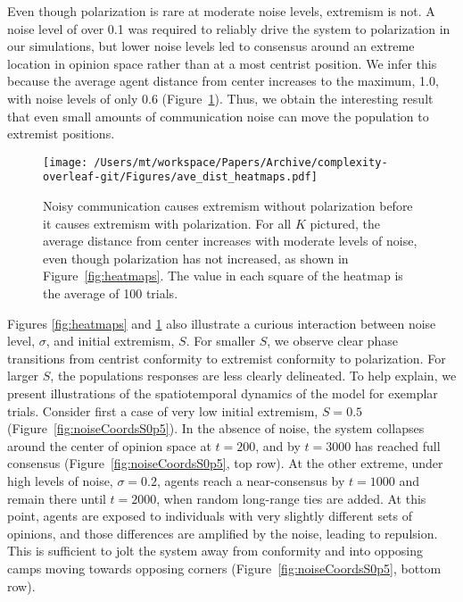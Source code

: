 Even though polarization is rare at moderate noise levels, extremism is not.
A noise level of over 0.1 was required to reliably drive
the system to polarization in our simulations, but lower noise levels led to consensus around an
extreme location in opinion space rather than at a most centrist position. We infer this because the average agent distance from center increases to the maximum, 1.0, with noise levels of only 0.6
(Figure~\ref{fig:avedistHeatmaps}). Thus, we obtain the interesting result that
even small amounts of communication noise can move the population to extremist
positions. 


\begin{figure}[H]
  \centering
  \texttt{[image: /Users/mt/workspace/Papers/Archive/complexity-overleaf-git/Figures/ave\_dist\_heatmaps.pdf]}
  \caption{Noisy communication causes extremism without polarization before
    it causes extremism with polarization.  For all $K$ pictured, the
    average distance from center increases with moderate levels of noise, even
    though polarization has not increased, as shown in Figure~\ref{fig:heatmaps}.
    The value in each square of the heatmap is the average of
    100 trials. 
  }
  \label{fig:avedistHeatmaps}
\end{figure}

Figures \ref{fig:heatmaps} and \ref{fig:avedistHeatmaps} also illustrate a curious interaction between noise level, $\sigma$, and initial extremism, $S$. For smaller $S$, we observe clear phase transitions from centrist conformity to extremist conformity to polarization. For larger $S$, the populations responses are less clearly delineated.
To help explain, we present illustrations of the spatiotemporal dynamics of the model for exemplar trials. 
Consider first a case of very low initial extremism, $S=0.5$  (Figure~\ref{fig:noiseCoordsS0p5}). 
In the absence of noise, the system collapses around the center of opinion space at $t=200$, and by 
$t=3000$ has reached full consensus (Figure~\ref{fig:noiseCoordsS0p5}, top row). At the other extreme, under high levels of noise, $\sigma=0.2$,
agents reach a near-consensus by $t=1000$ and remain there until $t=2000$, when random long-range ties are added. 
At this point, agents are exposed to individuals with very slightly different sets of opinions, and those differences are amplified by the noise, leading to repulsion. This is sufficient to jolt the system away from conformity and into opposing camps moving towards opposing corners 
(Figure~\ref{fig:noiseCoordsS0p5}, bottom row). 

